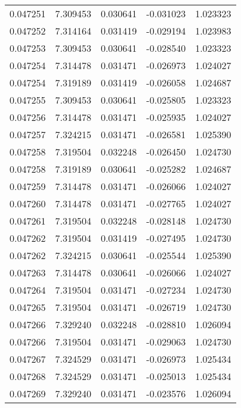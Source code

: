 \begin{tabular}{lrrrr}
0.047251    &  7.309453 &  0.030641 & -0.031023 &             1.023323 \\
0.047252    &  7.314164 &  0.031419 & -0.029194 &             1.023983 \\
0.047253    &  7.309453 &  0.030641 & -0.028540 &             1.023323 \\
0.047254    &  7.314478 &  0.031471 & -0.026973 &             1.024027 \\
0.047254    &  7.319189 &  0.031419 & -0.026058 &             1.024687 \\
0.047255    &  7.309453 &  0.030641 & -0.025805 &             1.023323 \\
0.047256    &  7.314478 &  0.031471 & -0.025935 &             1.024027 \\
0.047257    &  7.324215 &  0.031471 & -0.026581 &             1.025390 \\
0.047258    &  7.319504 &  0.032248 & -0.026450 &             1.024730 \\
0.047258    &  7.319189 &  0.030641 & -0.025282 &             1.024687 \\
0.047259    &  7.314478 &  0.031471 & -0.026066 &             1.024027 \\
0.047260    &  7.314478 &  0.031471 & -0.027765 &             1.024027 \\
0.047261    &  7.319504 &  0.032248 & -0.028148 &             1.024730 \\
0.047262    &  7.319504 &  0.031419 & -0.027495 &             1.024730 \\
0.047262    &  7.324215 &  0.030641 & -0.025544 &             1.025390 \\
0.047263    &  7.314478 &  0.030641 & -0.026066 &             1.024027 \\
0.047264    &  7.319504 &  0.031471 & -0.027234 &             1.024730 \\
0.047265    &  7.319504 &  0.031471 & -0.026719 &             1.024730 \\
0.047266    &  7.329240 &  0.032248 & -0.028810 &             1.026094 \\
0.047266    &  7.319504 &  0.031471 & -0.029063 &             1.024730 \\
0.047267    &  7.324529 &  0.031471 & -0.026973 &             1.025434 \\
0.047268    &  7.324529 &  0.031471 & -0.025013 &             1.025434 \\
0.047269    &  7.329240 &  0.031471 & -0.023576 &             1.026094 \\

\end{tabular}
